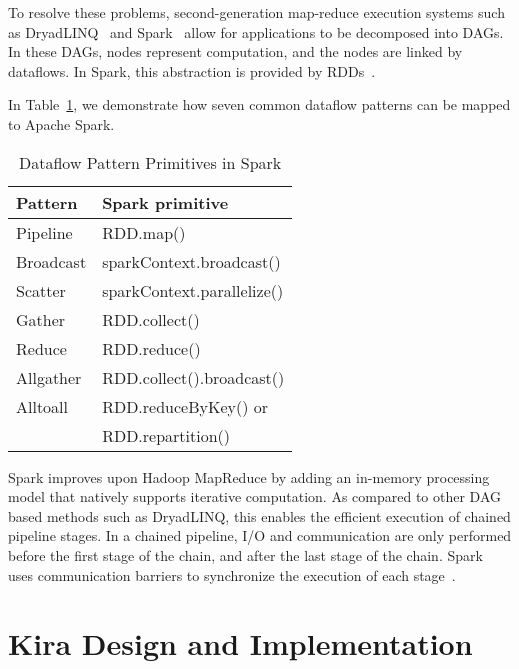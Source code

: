 \documentclass[conference]{IEEEtran}
\begin{document}
To resolve these problems, second-generation map-reduce execution systems such as
DryadLINQ~\cite{yu08} and Spark~\cite{zaharia12} allow for applications to be decomposed into
DAGs. In these DAGs, nodes represent computation, and the nodes are
linked by dataflows. In Spark, this abstraction is provided by RDDs~\cite{zaharia12}.

In Table~\ref{tb:Patterns}, we demonstrate how seven common dataflow patterns can be mapped
to Apache Spark.

\begin{table}[h]
  \begin{center}
  \caption{Dataflow Pattern Primitives in Spark}
    \begin{small}
    \begin{tabular}{ | p{1.8cm} | p{5.5cm} |}
    \hline
    Pattern & Spark primitive \\
    \hline \hline
    Pipeline & RDD.map()  \\ 
    Broadcast & sparkContext.broadcast() \\   
    Scatter & sparkContext.parallelize() \\ 
    Gather & RDD.collect() \\ 
    Reduce & RDD.reduce() \\ 
    Allgather & RDD.collect().broadcast() \\ 
    Alltoall & RDD.reduceByKey() or \\
 & RDD.repartition() \\ 
    \hline
    \end{tabular}
    \end{small}   
  \label{tb:Patterns}     	
  \end{center}
\end{table}

Spark improves upon
Hadoop MapReduce by adding an in-memory processing model that natively supports iterative computation. 
As compared to other DAG based methods such as DryadLINQ, this enables
the efficient execution of chained pipeline stages. In a chained pipeline,
I/O and communication are only performed before the first stage of the chain, and after the
last stage of the chain. Spark uses communication barriers to synchronize the execution of each stage~\cite{zaharia12}.

\section{Kira Design and Implementation}
\label{sec:Design}
\end{document}
